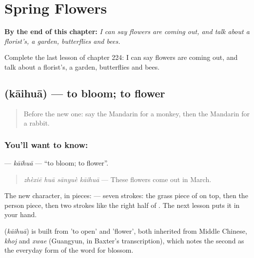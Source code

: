 
\chapter{Spring Flowers}
\label{ch:zh-spring-flowers}

\begin{chapteropening}
\textbf{By the end of this chapter:} \emph{I can say flowers are coming out, and talk about a florist's, a garden, butterflies and bees.}

Complete the last lesson of chapter 224: I can say flowers are coming out, and talk about a florist's, a garden, butterflies and bees.
\end{chapteropening}

\section[\texorpdfstring{\zh{开花} (kāihuā)}{开花 (kāihuā)}]{ (kāihuā) — to bloom; to flower}

\label{lesson:ZH-C224-kaihua}



\begin{quote}
Before the new one: say the Mandarin for a monkey, then the Mandarin for a rabbit.
\end{quote}

\subsection*{You'll want to know: }
\textbf{} — \emph{kāihuā} — \textquotedblleft{}to bloom; to flower\textquotedblright{}.

\begin{quote}
\textbf{} \emph{zhèxiē huā sānyuè kāihuā} — These flowers come out in March.
\end{quote}

The new character, in pieces:  — seven strokes: the grass piece of  on top, then the person piece, then two strokes like the right half of . The next lesson puts it in your hand.

\begin{cousinweb}
\textbf{} (\emph{kāihuā}) is built from  'to open' and  'flower', both inherited from Middle Chinese, \emph{khoj} and \emph{xwae} (Guangyun, in Baxter's transcription), which notes the second as the everyday form of the word for blossom.
\end{cousinweb}

